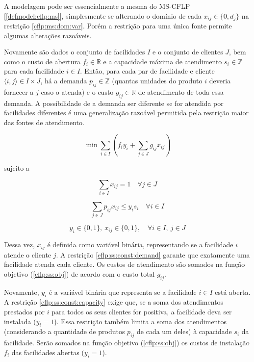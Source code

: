 \documentclass[]{article}
\begin{document}
	 		A modelagem pode ser essencialmente a mesma do MS-CFLP [\ref{defmodel:cflp:ms}], simplesmente se alterando o domínio de cada $x_{ij} \in \{ 0, d_j \}$ na restrição \ref{cflp:ms:dom:var}. 
	 		Porém a restrição para uma única fonte permite algumas alterações razoáveis.
	 		
	 		Novamente são dados o conjunto de facilidades $I$ e o conjunto de clientes $J$, bem como o custo de abertura $f_i \in \mathbb{R}$ e a capacidade máxima de atendimento $s_i \in \mathbb{Z}$ para cada facilidade $i \in I$. 
	 		Então, para cada par de facilidade e cliente $\langle i, j \rangle \in I \times J$, há a demanda $p_{ij} \in \mathbb{Z}$ (quantas unidades do produto $i$ deveria fornecer a $j$ caso o atenda) e o custo $g_{ij} \in \mathbb{R}$ de atendimento de toda essa demanda.  	 		
	 		A possibilidade de a demanda ser diferente se for atendida por facilidades diferentes é uma generalização razoável permitida pela restrição maior das fontes de atendimento.
	 		
	 		\begin{equation}
	 			\label{cflp:ss:obj}		
	 			\min \sum_{i \in I} 
	 			(
	 			f_i y_i + \sum_{j \in J} g_{ij} x_{ij}
	 			)
	 		\end{equation}
 		
 			sujeito a 				
 			
 			\begin{equation}
 				\label{cflp:ss:const:demand}		
 				\sum_{i \in I} x_{ij} = 1 
 				\quad
 				\forall j \in J
 			\end{equation}
 		
 			\begin{equation}
 				\label{cflp:ss:const:capacity}		
 				\sum_{j \in J} p_{ij} x_{ij} \le y_i s_i 
 				\quad
 				\forall i \in I
 			\end{equation}
 		
 			\begin{equation}
 				\label{cflp:ss:dom:var}		
 				y_i \in \{0, 1\}, 
 				\ x_{ij} \in \{0, 1\}, 
 				\quad
 				\forall i \in I, \ j \in J
 			\end{equation}
 		
 			Dessa vez, $x_{ij}$ é definida como variável binária, representando se a facilidade $i$ atende o cliente $j$. 
 			A restrição \ref{cflp:ss:const:demand} garante que exatamente uma facilidade atenda cada cliente.
 			Os custos de atendimento são somados na função objetivo (\ref{cflp:ss:obj}) de acordo com o custo total $g_{ij}$. 		
 			
 			Novamente, $y_i$ é a variável binária que representa se a facilidade $i \in I$ está aberta.
 			A restrição \ref{cflp:ss:const:capacity} exige que, se a soma dos atendimentos prestados por $i$ para todos os seus clientes for positiva, a facilidade deva ser instalada ($y_i = 1$). 
 			Essa restrição também limita a soma dos atendimentos (considerando a quantidade de produtos $p_{ij}$ de cada um deles) à capacidade $s_i$ da facilidade.
 			Serão somados na função objetivo (\ref{cflp:ss:obj}) os custos de instalação $f_i$ das facilidades abertas ($y_i = 1$).
 			
\end{document}
